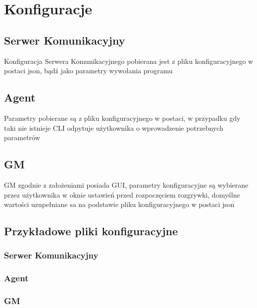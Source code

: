 \documentclass[./../Dokumentacja.tex]{subfiles}
\begin{document}
\section{Konfiguracje}
\label{sec:Konfiguracje}
\subsection{Serwer Komunikacyjny}
Konfiguracja Serwera Komunikacyjnego pobierana jest z pliku konfiguracyjnego w postaci json,
bądź jako parametry wywołania programu

\subsection{Agent}
Parametry pobierane są z pliku konfiguracyjnego w postaci, w przypadku gdy taki nie istnieje
CLI odpytuje użytkownika o wprowadzenie potrzebnych parametrów

\subsection{GM}
GM zgodnie z założeniami posiada GUI, parametry konfiguracyjne są wybierane przez użytkownika w
oknie ustawień przed rozpoczęciem rozgrywki, domyślne wartości uzupełniane sa na podstawie pliku
konfiguracyjnego w postaci json

\subsection{Przykładowe pliki konfiguracyjne}
\subsubsection{Serwer Komunikacyjny}

\subsubsection{Agent}

\subsubsection{GM}

\end{document}
